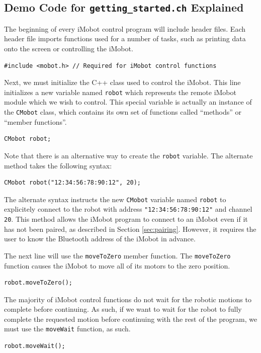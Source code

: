 \documentclass{article}
\begin{document}
\subsection{\label{sec:democode}Demo Code for \texttt{getting\_started.ch} Explained}
The beginning of every iMobot control program will include header files. Each
header file imports functions used for a number of tasks, such as printing
data onto the screen or controlling the iMobot. 

\begin{verbatim}
#include <mobot.h> // Required for iMobot control functions
\end{verbatim}

Next, we must initialize the C++ class used to control the iMobot. This line
initializes a new variable named \texttt{robot} which represents the remote
iMobot module which we wish to control. This special variable is actually an
instance of the \texttt{CMobot} class, which contains its own set of
functions called ``methods'' or ``member functions''.
\begin{verbatim}
CMobot robot;
\end{verbatim}
Note that there is an alternative way to create the \texttt{robot} variable.
The alternate method takes the following syntax:
\begin{verbatim}
CMobot robot("12:34:56:78:90:12", 20);
\end{verbatim}
The alternate syntax instructs the new \texttt{CMobot} variable named 
\texttt{robot} to explicitely connect to the robot with address
\texttt{"12:34:56:78:90:12"} and channel \texttt{20}. This method allows
the iMobot program to connect to an iMobot even if it has not been paired,
as described in Section \ref{sec:pairing}. However, it requires the user
to know the Bluetooth address of the iMobot in advance.

The next line will use the \texttt{moveToZero} member function. The
\texttt{moveToZero} function causes the iMobot to move all of its motors to the
zero position.
\begin{verbatim}
robot.moveToZero();
\end{verbatim}

The majority of iMobot control functions do not wait for the robotic motions to
complete before continuing. As such, if we want to wait for the robot to fully
complete the requested motion before continuing with the rest of the program,
we must use the \texttt{moveWait} function, as such.
\begin{verbatim}
robot.moveWait();
\end{verbatim}
\end{document}
